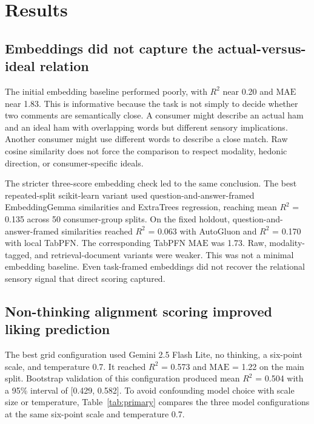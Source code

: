 \documentclass[12pt]{article}
\newcommand{\Rtwo}{\ensuremath{R^2}}
\newcommand{\mae}{\ensuremath{\mathrm{MAE}}}
\newcommand{\fl}{Gemini 2.5 Flash Lite}
\begin{document}
\section{Results}

\subsection{Embeddings did not capture the actual-versus-ideal relation}

The initial embedding baseline performed poorly, with \Rtwo{} near 0.20 and \mae{} near 1.83. This is informative because the task is not simply to decide whether two comments are semantically close. A consumer might describe an actual ham and an ideal ham with overlapping words but different sensory implications. Another consumer might use different words to describe a close match. Raw cosine similarity does not force the comparison to respect modality, hedonic direction, or consumer-specific ideals.

The stricter three-score embedding check led to the same conclusion. The best repeated-split scikit-learn variant used question-and-answer-framed EmbeddingGemma similarities and ExtraTrees regression, reaching mean \Rtwo{} = 0.135 across 50 consumer-group splits. On the fixed holdout, question-and-answer-framed similarities reached \Rtwo{} = 0.063 with AutoGluon and \Rtwo{} = 0.170 with local TabPFN. The corresponding TabPFN \mae{} was 1.73. Raw, modality-tagged, and retrieval-document variants were weaker. This was not a minimal embedding baseline. Even task-framed embeddings did not recover the relational sensory signal that direct scoring captured.

\subsection{Non-thinking alignment scoring improved liking prediction}

The best grid configuration used \fl{}, no thinking, a six-point scale, and temperature 0.7. It reached \Rtwo{} = 0.573 and \mae{} = 1.22 on the main split. Bootstrap validation of this configuration produced mean \Rtwo{} = 0.504 with a 95\% interval of [0.429, 0.582]. To avoid confounding model choice with scale size or temperature, Table~\ref{tab:primary} compares the three model configurations at the same six-point scale and temperature 0.7.
\end{document}
